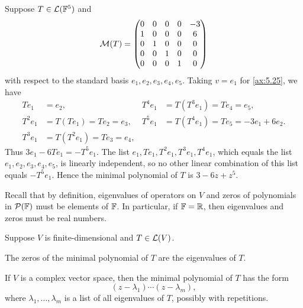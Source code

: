 \begin{example}\label{ax:5.26}
Suppose $T\in\mathcal{L}(\mathbb{F}^5)$ and
\[ \mathcal{M}(T)=\begin{pmatrix}
  0 & 0 & 0 & 0 & -3\\
  1 & 0 & 0 & 0 & 6\\
  0 & 1 & 0 & 0 & 0\\
  0 & 0 & 1 & 0 & 0\\
  0 & 0 & 0 & 1 & 0
\end{pmatrix} \]
with respect to the standard basis $e_1,e_2,e_3,e_4,e_5$. Taking $v=e_1$ for
\ref{ax:5.25}, we have
\begin{align*}
Te_1 &= e_2, & T^4e_1 &= T(T^3e_1)=Te_4=e_5,\\
T^2e_1 &= T(Te_1)=Te_2=e_3, & T^5e_1 &= T(T^4e_1)=Te_5=-3e_1+6e_2.\\
T^3e_1 &= T(T^2e_1)=Te_3=e_4,
\end{align*}
Thus $3e_1-6Te_1=-T^5e_1$. The list $e_1,Te_1,T^2e_1,T^3e_1,T^4e_1$, which
equals the list $e_1,e_2,e_3,e_4,e_5$, is linearly independent, so no other
linear combination of this list equals $-T^5e_1$. Hence the minimal polynomial
of $T$ is $3-6z+z^5$.
\end{example}

Recall that by definition, eigenvalues of operators on $V$ and zeros of
polynomials in $\mathcal{P}(\mathbb{F})$ must be elements of $\mathbb{F}$. In particular, if
$\mathbb{F}=\mathbb{R}$, then eigenvalues and zeros must be real numbers.

\begin{result}\label{ax:5.27}
Suppose $V$ is finite-dimensional and $T\in\mathcal{L}(V)$.
\begin{parts}
\item The zeros of the minimal polynomial of $T$ are the eigenvalues of $T$.
\item If $V$ is a complex vector space, then the minimal polynomial of $T$ has
  the form
  \[ (z-\lambda_1)\cdots(z-\lambda_m), \]
  where $\lambda_1,\dots,\lambda_m$ is a list of all eigenvalues of $T$,
  possibly with repetitions.
\end{parts}
\end{result}

